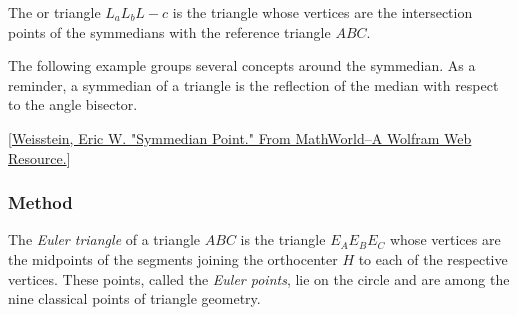 The  or  triangle $L_aL_bL-c$  is the triangle whose vertices are the intersection points of the symmedians with the reference triangle $ABC$.

The following example groups several concepts around the symmedian. As a reminder, a symmedian of a triangle is the reflection of the median with respect to the angle bisector.

\begin{flushright}
  \small
[\href{https://mathworld.wolfram.com/SymmedianPoint.html}{Weisstein, Eric W. "Symmedian Point." From MathWorld--A Wolfram Web Resource.}]
\end{flushright}

\vspace{1em}

\begin{minipage}{.5\textwidth}
\end{minipage}
\begin{minipage}{.5\textwidth}
\begin{tkzexample}
\end{tkzexample}
\end{minipage}




\subsubsection{Method } %
\label{ssub:method_triangle_euler}

The \emph{Euler triangle} of a triangle $ABC$ is the triangle $E_AE_BE_C$ whose vertices are the midpoints of the segments joining the orthocenter $H$ to each of the respective vertices. These points, called the \emph{Euler points}, lie on the  circle and are among the nine classical points of triangle geometry.

